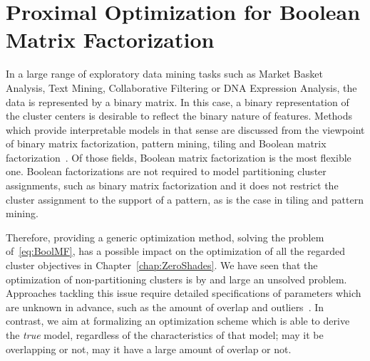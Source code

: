 \chapter{Proximal Optimization for Boolean Matrix Factorization}
\label{chap:PALMB}
In a large range of exploratory data mining tasks such as Market Basket Analysis, Text Mining, Collaborative Filtering or DNA Expression Analysis, the data is represented by a binary matrix. In this case, a binary representation of the cluster centers is desirable to reflect the binary nature of features. Methods which provide interpretable models in that sense are discussed from the viewpoint of binary matrix factorization, pattern mining, tiling and Boolean matrix factorization~\citep{tatti2012comparing,zimek2015blind}. Of those fields, Boolean matrix factorization is the most flexible one. Boolean factorizations are not required to model partitioning cluster assignments, such as binary matrix factorization and it does not restrict the cluster assignment to the support of a pattern, as is the case in tiling and pattern mining. 
 
Therefore, providing a generic optimization method, solving the problem of~\ref{eq:BoolMF}, has a possible impact on the optimization of all the regarded cluster objectives in Chapter~\ref{chap:ZeroShades}. We have seen that the optimization of non-partitioning clusters is by and large an unsolved problem. Approaches tackling this issue require detailed specifications of parameters which are unknown in advance, such as the amount of overlap and outliers~\citep{whang2017nonCo}. In contrast, we aim at formalizing an optimization scheme which is able to derive the \emph{true} model, regardless of the characteristics of that model; may it be overlapping or not, may it have a large amount of overlap or not. 

